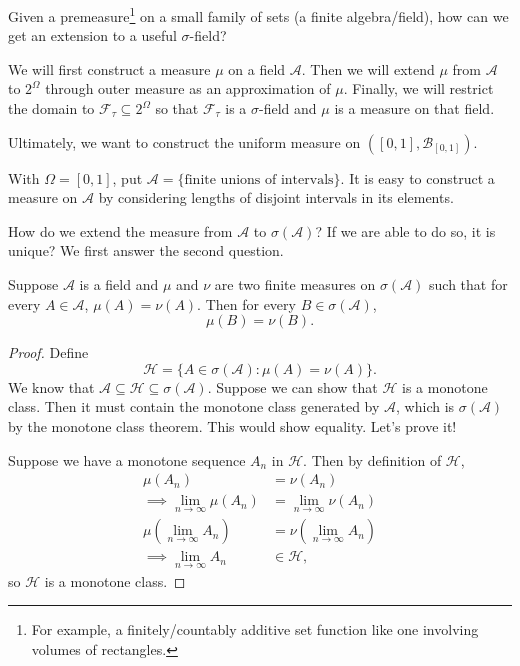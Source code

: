 Given a premeasure\footnote{For example, a finitely/countably additive set function like one involving volumes of rectangles.} on a small family of sets (a finite algebra/field), how can we get an extension to a useful $\sigma$-field?

We will first construct a measure $\mu$ on a field $\mathscr{A}$.
Then we will extend $\mu$ from $\mathscr{A}$ to $2^{\Omega}$ through outer measure as an approximation of $\mu$.
Finally, we will restrict the domain to $\mathscr{F}_\tau \subseteq 2^{\Omega}$ so that $\mathscr{F}_\tau$ is a $\sigma$-field and $\mu$ is a measure on that field.

Ultimately, we want to construct the uniform measure on $\left( [0,1], \mathscr{B}_{[0,1]} \right)$.

\begin{example}
	With $\Omega = [0,1]$, put $\mathscr{A} = \{\text{finite unions of intervals}\}$. It is easy to construct a measure on $\mathscr{A}$ by considering lengths of disjoint intervals in its elements.
\end{example}

How do we extend the measure from $\mathscr{A}$ to $\sigma(\mathscr{A})$? If we are able to do so, it is unique? We first answer the second question.

\begin{theorem}
	Suppose $\mathscr{A}$ is a field and $\mu$ and $\nu$ are two finite measures on $\sigma(\mathscr{A})$ such that for every $A \in \mathscr{A}$, $\mu(A) = \nu(A)$. Then for every $B \in \sigma(\mathscr{A})$, \[
		\mu(B) = \nu(B)
	.\] 
\end{theorem}

\begin{proof}
	Define \[
		\mathscr{H} = \{A \in \sigma(\mathscr{A}): \mu(A) = \nu(A)\}
	.\] We know that $\mathscr{A} \subseteq  \mathscr{H} \subseteq \sigma(\mathscr{A})$.
	Suppose we can show that $\mathscr{H}$ is a monotone class. Then it must contain the monotone class generated by $\mathscr{A}$, which is $\sigma(\mathscr{A})$ by the monotone class theorem. This would show equality. Let's prove it!

	Suppose we have a monotone sequence $A_n$ in $\mathscr{H}$. Then by definition of $\mathscr{H}$,
	\begin{align*}
		\mu(A_n) &= \nu(A_n) \\
		\implies \lim\limits_{n \to \infty} \mu(A_n) &= \lim\limits_{n \to \infty} \nu(A_n) \\
		\mu( \lim\limits_{n \to \infty} A_n) &= \nu \left( \lim\limits_{n \to \infty} A_n \right) \\
		\implies \lim\limits_{n \to \infty} A_n &\in \mathscr{H}
	,\end{align*}
	so $\mathscr{H}$ is a monotone class.
\end{proof}

